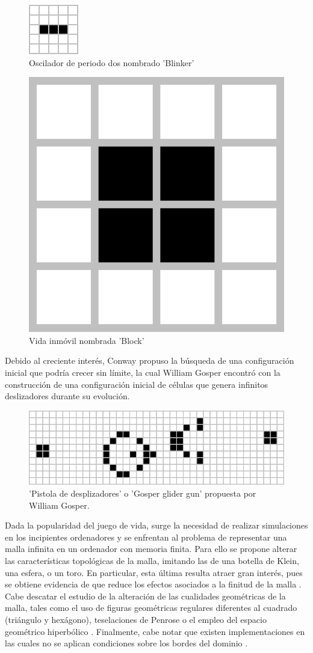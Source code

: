 \documentclass[../proyecto.tex]{book}
\begin{document}
\begin{figure}[H]
	\centering
	\includegraphics[height=.15\linewidth]{./images/blinker.png}
	\caption{Oscilador de periodo dos nombrado 'Blinker'}
\end{figure} 
\begin{figure}[H]
	
	\centering
	\includegraphics[height=.15\linewidth]{./images/block.png}
	\caption{Vida inmóvil nombrada 'Block'}
\end{figure} 

Debido al creciente interés, Conway propuso la búsqueda de una configuración inicial que podría crecer sin límite, la cual William Gosper encontró con la construcción de una configuración inicial de células que genera infinitos deslizadores durante su evolución. 

\begin{figure}[H]
	
	\centering
	\includegraphics[scale=0.55]{./images/glider_gun.png}
	\caption{'Pistola de desplizadores' o 'Gosper glider gun' propuesta por William Gosper.}
	
\end{figure} 

Dada la popularidad del juego de vida, surge la necesidad de realizar simulaciones en los incipientes ordenadores y se enfrentan al problema de representar una malla infinita en un ordenador con memoria finita. Para ello se propone alterar las características topológicas de la malla, imitando las de una botella de Klein, una esfera, o un toro. En particular, esta última resulta atraer gran interés, pues se obtiene evidencia de que reduce los efectos asociados a la finitud de la malla \cite{finitudMalla, finitudMalla2}. Cabe descatar el estudio de la alteración de las cualidades geométricas de la malla, tales como el uso de figuras geométricas regulares diferentes al cuadrado (triángulo y hexágono)\cite{triangular}, teselaciones de Penrose \cite{penrose} o el empleo del espacio geométrico hiperbólico \cite{hiperbolico}. Finalmente, cabe notar que existen implementaciones en las cuales no se aplican condiciones sobre los bordes del dominio \cite{boardless}.
\end{document}
